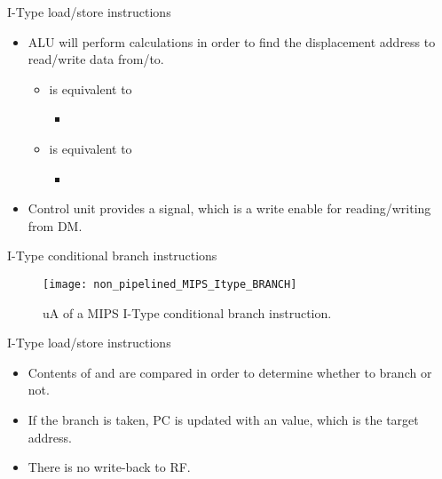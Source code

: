% 
\begin{frame}{I-Type load/store instructions}
\begin{itemize}
\item \ac{ALU} will perform calculations in order to find the displacement address to read/write data from/to.
\begin{itemize}
\item {} is equivalent to
\begin{itemize}
\item[] 
\end{itemize} 
\item[]  is equivalent to 
\begin{itemize}
\item[] 
\end{itemize}
\end{itemize}
\item Control unit provides a  signal, which is a write enable for reading/writing from \ac{DM}.
\end{itemize}
\end{frame}

% 
\begin{frame}{I-Type conditional branch instructions}
  \begin{figure}
  \centering
  \texttt{[image: non\_pipelined\_MIPS\_Itype\_BRANCH]}
  \vspace{-3pt}
  \caption{\ac{uA} of a \ac{MIPS} I-Type conditional branch instruction.}
  \label{Figure:non_pipelined_MIPS_Itype_BRANCH}
  \end{figure}
\end{frame}

%
\begin{frame}{I-Type load/store instructions}
\begin{itemize}
\item Contents of  and  are compared in order to determine whether to branch or not.
\item If the branch is taken, \ac{PC} is updated with an  value, which is the target address.
\item There is no write-back to \ac{RF}.
\end{itemize}
\end{frame}

